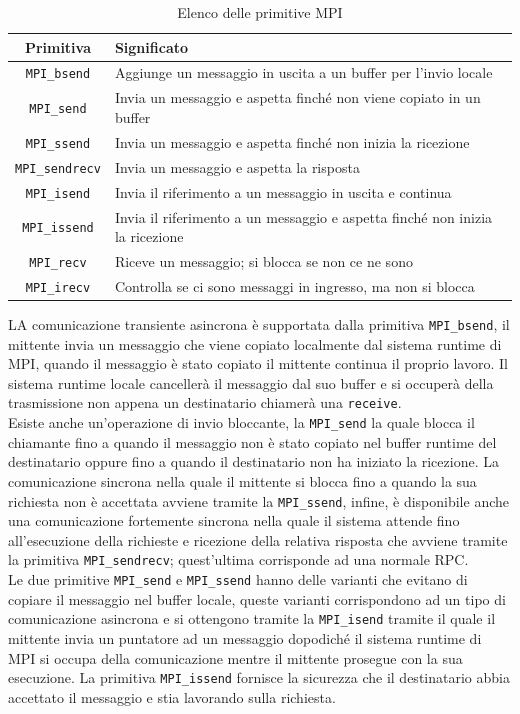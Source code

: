 \begin{table}
\centering
\begin{tabular}{|c|l|}
\hline
\textbf{Primitiva} & \textbf{Significato} \\
\hline
\texttt{MPI\_bsend} & Aggiunge un messaggio in uscita a un buffer per l'invio locale \\
\texttt{MPI\_send} & Invia un messaggio e aspetta finché non viene copiato in un buffer\\
\texttt{MPI\_ssend} & Invia un messaggio e aspetta finché non inizia la ricezione\\
\texttt{MPI\_sendrecv} & Invia un messaggio e aspetta la risposta \\
\texttt{MPI\_isend} & Invia il riferimento a un messaggio in uscita e continua \\
\texttt{MPI\_issend} & Invia il riferimento a un messaggio e aspetta finché non inizia la ricezione \\
\texttt{MPI\_recv} & Riceve un messaggio; si blocca se non ce ne sono \\
\texttt{MPI\_irecv} & Controlla se ci sono messaggi in ingresso, ma non si blocca \\
\hline
\end{tabular}
\caption{Elenco delle primitive MPI}\label{tab:mpi}
\end{table}
LA comunicazione transiente asincrona è supportata dalla primitiva \texttt{MPI\_bsend}, il mittente invia un messaggio che viene copiato localmente dal sistema runtime di MPI, quando il messaggio è stato copiato il mittente continua il proprio lavoro. Il sistema runtime locale cancellerà il messaggio dal suo buffer e si occuperà della trasmissione non appena un destinatario chiamerà una \texttt{receive}.\\
Esiste anche un'operazione di invio bloccante, la \texttt{MPI\_send} la quale blocca il chiamante fino a quando il messaggio non è stato copiato nel buffer runtime del destinatario oppure fino a quando il destinatario non ha iniziato la ricezione. La comunicazione sincrona nella quale il mittente si blocca fino a quando la sua richiesta non è accettata avviene tramite la \texttt{MPI\_ssend}, infine, è disponibile anche una comunicazione fortemente sincrona nella quale il sistema attende fino all'esecuzione della richieste e ricezione della relativa risposta che avviene tramite la primitiva \texttt{MPI\_sendrecv}; quest'ultima corrisponde ad una normale RPC.\\
Le due primitive \texttt{MPI\_send} e \texttt{MPI\_ssend} hanno delle varianti che evitano di copiare il messaggio nel buffer locale, queste varianti corrispondono ad un tipo di comunicazione asincrona e si ottengono tramite la \texttt{MPI\_isend} tramite il quale il mittente invia un puntatore ad un messaggio dopodiché il sistema runtime di MPI si occupa della comunicazione mentre il mittente prosegue con la sua esecuzione. La primitiva \texttt{MPI\_issend} fornisce la sicurezza che il destinatario abbia accettato il messaggio e stia lavorando sulla richiesta.\\
